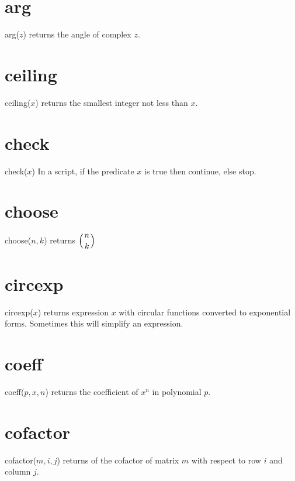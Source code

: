 \documentclass[12pt,openany]{report}
\begin{document}
\section*{arg}
arg($z$) returns the angle of complex $z$.

\section*{ceiling}
ceiling($x$) returns the smallest integer not less than $x$.

\section*{check}
check($x$) In a script, if the predicate $x$ is true then continue, else stop.

\section*{choose}
choose($n,k$) returns $\displaystyle\left({n \atop k}\right)$

\section*{circexp}
circexp($x$) returns expression $x$ with circular functions converted
to exponential forms.
Sometimes this will simplify an expression.

\section*{coeff}
coeff($p,x,n$) returns the coefficient of $x^n$ in polynomial $p$.

\section*{cofactor}
cofactor($m,i,j$) returns of the cofactor of matrix $m$ with respect to row $i$ and column $j$.
\end{document}
